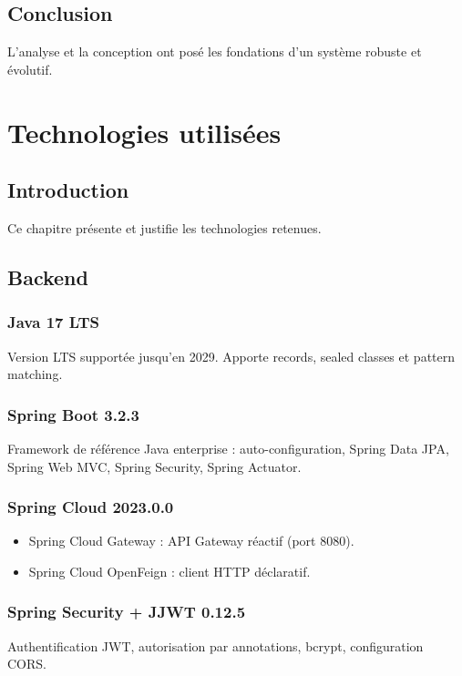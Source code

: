 \documentclass[12pt,a4paper,oneside]{report}
\begin{document}
\section{Conclusion}
L'analyse et la conception ont posé les fondations d'un système robuste et évolutif.

\chapter{Technologies utilisées}

\section{Introduction}
Ce chapitre présente et justifie les technologies retenues.

\section{Backend}

\subsection{Java 17 LTS}
Version LTS supportée jusqu'en 2029. Apporte records, sealed classes et pattern matching.

\subsection{Spring Boot 3.2.3}
Framework de référence Java enterprise : auto-configuration, Spring Data JPA, Spring Web MVC, Spring Security, Spring Actuator.

\subsection{Spring Cloud 2023.0.0}
\begin{itemize}
    \item Spring Cloud Gateway : API Gateway réactif (port 8080).
    \item Spring Cloud OpenFeign : client HTTP déclaratif.
\end{itemize}

\subsection{Spring Security + JJWT 0.12.5}
Authentification JWT, autorisation par annotations, bcrypt, configuration CORS.
\end{document}
